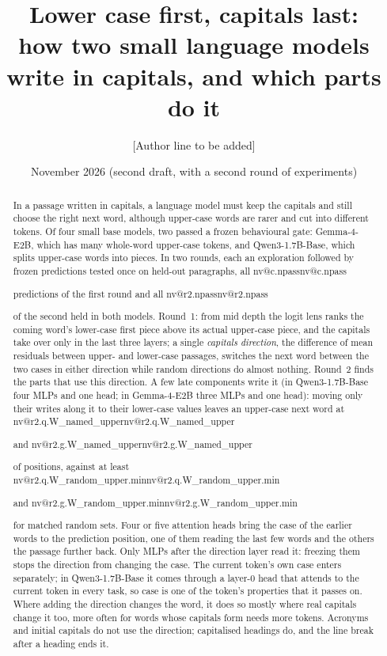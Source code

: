 \documentclass[11pt]{article}
\title{\textbf{Lower case first, capitals last:\\ how two small language models write in capitals, and which parts do it}}
\author{[Author line to be added]}
\date{\vspace{-1.5em}November 2026 (second draft, with a second round of experiments)}
\makeatletter
\newcommand{\nv}[1]{\ifcsname nv@#1\endcsname\csname nv@#1\endcsname\else\PackageError{numbers}{Unknown number key #1}{}\fi}
\newcommand{\gm}{Gemma-4-E2B}
\newcommand{\qw}{Qwen3-1.7B-Base}
\newcommand{\RQ}[1]{\nv{r2.q.#1}}
\newcommand{\RG}[1]{\nv{r2.g.#1}}
\makeatother
\begin{document}
\maketitle
\vspace{-2em}

\begin{abstract}
\noindent
In a passage written in capitals, a language model must keep the capitals and still choose the right next word, although upper-case words are rarer and cut into different tokens. Of four small base models, two passed a frozen behavioural gate: \gm{}, which has many whole-word upper-case tokens, and \qw{}, which splits upper-case words into pieces. In two rounds, each an exploration followed by frozen predictions tested once on held-out paragraphs, all \nv{c.npass} predictions of the first round and all \nv{r2.npass} of the second held in both models. Round~1: from mid depth the logit lens ranks the coming word's lower-case first piece above its actual upper-case piece, and the capitals take over only in the last three layers; a single \emph{capitals direction}, the difference of mean residuals between upper- and lower-case passages, switches the next word between the two cases in either direction while random directions do almost nothing. Round~2 finds the parts that use this direction. A few late components write it (in \qw{} four MLPs and one head; in \gm{} three MLPs and one head): moving only their writes along it to their lower-case values leaves an upper-case next word at \RQ{W_named_upper} and \RG{W_named_upper} of positions, against at least \RQ{W_random_upper.min} and \RG{W_random_upper.min} for matched random sets. Four or five attention heads bring the case of the earlier words to the prediction position, one of them reading the last few words and the others the passage further back. Only MLPs after the direction layer read it: freezing them stops the direction from changing the case. The current token's own case enters separately; in \qw{} it comes through a layer-0 head that attends to the current token in every task, so case is one of the token's properties that it passes on. Where adding the direction changes the word, it does so mostly where real capitals change it too, more often for words whose capitals form needs more tokens. Acronyms and initial capitals do not use the direction; capitalised headings do, and the line break after a heading ends it.
\end{abstract}

\end{document}
